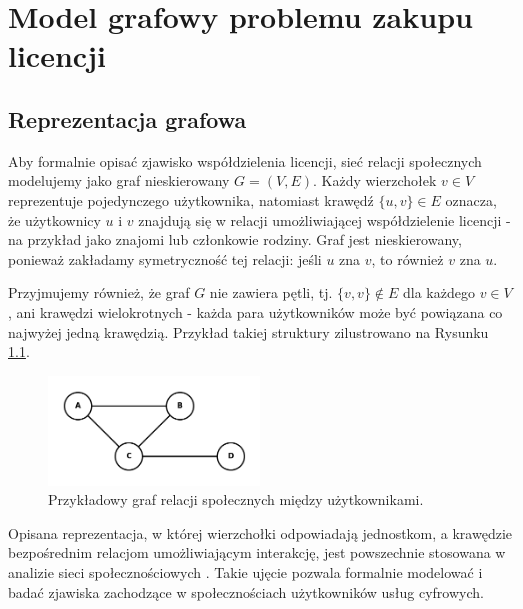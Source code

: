 \chapter{Model grafowy problemu zakupu licencji}

\section{Reprezentacja grafowa}

Aby formalnie opisać zjawisko współdzielenia licencji, sieć relacji społecznych modelujemy jako graf nieskierowany \( G = (V, E) \). Każdy wierzchołek \( v \in V \) reprezentuje pojedynczego użytkownika, natomiast krawędź \( \{u, v\} \in E \) oznacza, że użytkownicy \( u \) i \( v \) znajdują się w relacji umożliwiającej współdzielenie licencji - na przykład jako znajomi lub członkowie rodziny. Graf jest nieskierowany, ponieważ zakładamy symetryczność tej relacji: jeśli \( u \) zna \( v \), to również \( v \) zna \( u \).

Przyjmujemy również, że graf \( G \) nie zawiera pętli, tj. \( \{v, v\} \notin E \) dla każdego \( v \in V \), ani krawędzi wielokrotnych - każda para użytkowników może być powiązana co najwyżej jedną krawędzią. Przykład takiej struktury zilustrowano na Rysunku \ref{fig:social_graph}.

\begin{figure}[h]
    \centering
    \includegraphics[width=0.5\textwidth]{assets/graphmodelexample.png}
    \caption{Przykładowy graf relacji społecznych między użytkownikami.}
    \label{fig:social_graph}
\end{figure}

Opisana reprezentacja, w której wierzchołki odpowiadają jednostkom, a krawędzie bezpośrednim relacjom umożliwiającym interakcję, jest powszechnie stosowana w analizie sieci społecznościowych \cite{Brandes2004, NETTLETON20131}. Takie ujęcie pozwala formalnie modelować i badać zjawiska zachodzące w społecznościach użytkowników usług cyfrowych.

